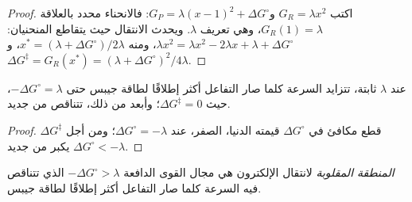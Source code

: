 \begin{proof}
اكتب $G_R = \lambda x^2$ و$G_P = \lambda(x - 1)^2 + \Delta G^\circ$: فالانحناء محدد بالعلاقة $G_R(1) = \lambda$، وهي
تعريف $\lambda$. ويحدث الانتقال حيث يتقاطع المنحنيان: $\lambda x^2 = \lambda x^2 - 2\lambda x + \lambda +
\Delta G^\circ$، ومنه $x^\ast = (\lambda + \Delta G^\circ)/2\lambda$، و$\Delta G^{\ddagger} = G_R(x^\ast) = (\lambda + \Delta G^\circ)^2/4\lambda$.
\end{proof}

\begin{corollary}\label{cor:b3:complex-mechanisms:inverted}
عند $\lambda$ ثابتة، تتزايد السرعة كلما صار التفاعل أكثر إطلاقًا لطاقة جيبس حتى
$-\Delta G^\circ = \lambda$، حيث $\Delta G^{\ddagger} = 0$؛ وأبعد من ذلك، تتناقص من جديد.
\end{corollary}

\begin{proof}
$\Delta G^{\ddagger}$ قطع مكافئ في $\Delta G^\circ$ قيمته الدنيا، الصفر، عند $\Delta G^\circ = -\lambda$؛ ومن أجل $\Delta G^\circ < -\lambda$ يكبر
من جديد.
\end{proof}

\begin{definition}\label{def:b3:complex-mechanisms:inverted}
\emph{المنطقة المقلوبة} لانتقال الإلكترون هي
مجال القوى الدافعة $-\Delta G^\circ > \lambda$ الذي تتناقص فيه السرعة كلما صار التفاعل
أكثر إطلاقًا لطاقة جيبس.
\end{definition}


